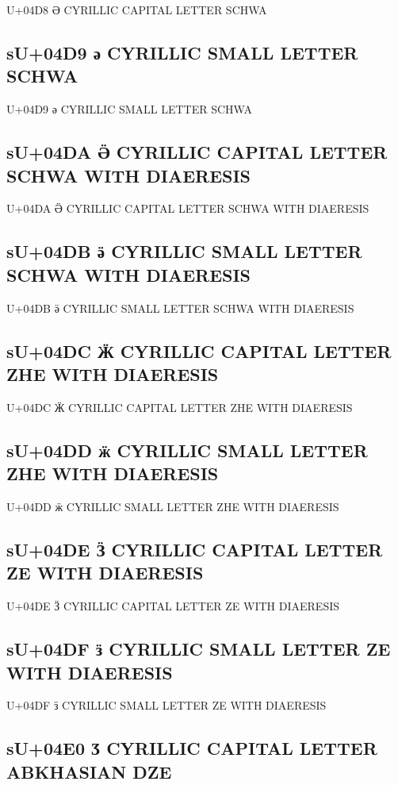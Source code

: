 U+04D8 Ә  CYRILLIC CAPITAL LETTER SCHWA

\subsection{sU+04D9 ә  CYRILLIC SMALL LETTER SCHWA}

U+04D9 ә  CYRILLIC SMALL LETTER SCHWA

\subsection{sU+04DA Ӛ  CYRILLIC CAPITAL LETTER SCHWA WITH DIAERESIS}

U+04DA Ӛ  CYRILLIC CAPITAL LETTER SCHWA WITH DIAERESIS

\subsection{sU+04DB ӛ  CYRILLIC SMALL LETTER SCHWA WITH DIAERESIS}

U+04DB ӛ  CYRILLIC SMALL LETTER SCHWA WITH DIAERESIS

\subsection{sU+04DC Ӝ  CYRILLIC CAPITAL LETTER ZHE WITH DIAERESIS}

U+04DC Ӝ  CYRILLIC CAPITAL LETTER ZHE WITH DIAERESIS

\subsection{sU+04DD ӝ  CYRILLIC SMALL LETTER ZHE WITH DIAERESIS}

U+04DD ӝ  CYRILLIC SMALL LETTER ZHE WITH DIAERESIS

\subsection{sU+04DE Ӟ  CYRILLIC CAPITAL LETTER ZE WITH DIAERESIS}

U+04DE Ӟ  CYRILLIC CAPITAL LETTER ZE WITH DIAERESIS

\subsection{sU+04DF ӟ  CYRILLIC SMALL LETTER ZE WITH DIAERESIS}

U+04DF ӟ  CYRILLIC SMALL LETTER ZE WITH DIAERESIS

\subsection{sU+04E0 Ӡ  CYRILLIC CAPITAL LETTER ABKHASIAN DZE}


